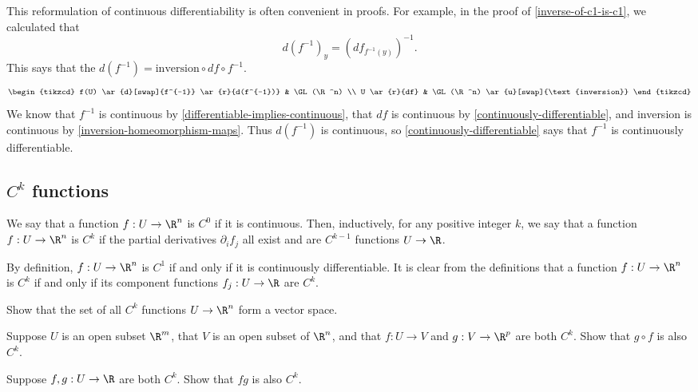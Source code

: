 \begin{remark}
	This reformulation of continuous differentiability is often convenient in proofs. For example, in the proof of \cref{inverse-of-c1-is-c1}, we calculated that
	\[ d(f^{-1})_y = (df_{f^{-1}(y)})^{-1}. \]
	This says that the $d(f^{-1}) = \text{inversion} \circ df \circ f^{-1}$. 
	\[ \begin{tikzcd} f(U) \ar{d}[swap]{f^{-1}} \ar{r}{d(f^{-1})} & \GL(\R^n) \\ U \ar{r}{df} & \GL(\R^n) \ar{u}[swap]{\text{inversion}}  \end{tikzcd} \]
	We know that $f^{-1}$ is continuous by \cref{differentiable-implies-continuous}, that $df$ is continuous by \cref{continuously-differentiable}, and inversion is continuous by \cref{inversion-homeomorphism-maps}. Thus $d(f^{-1})$ is continuous, so \cref{continuously-differentiable} says that $f^{-1}$ is continuously differentiable. 
\end{remark}

\subsection{\texorpdfstring{$C^k$}{Ck} functions}

\begin{definition}[$C^k$ functions] \label{cn-multivar}
	We say that a function $f : U \to \R^n$ is $C^0$ if it is continuous. Then, inductively, for any positive integer $k$, we say that a function $f : U \to \R^n$ is $C^k$ if the partial derivatives $\partial_i f_j$ all exist and are $C^{k-1}$ functions $U \to \R$. 
\end{definition}

By definition, $f : U \to \R^n$ is $C^1$ if and only if it is continuously differentiable. It is clear from the definitions that a function $f : U \to \R^n$ is $C^k$ if and only if its component functions $f_j : U \to \R$ are $C^k$. 

\begin{exercise}
	Show that the set of all $C^k$ functions $U \to \R^n$ form a vector space. 
\end{exercise}

\begin{exercise}
	Suppose $U$ is an open subset $\R^m$, that $V$ is an open subset of $\R^n$, and that $f : U \to V$ and $g : V \to \R^p$ are both $C^k$. Show that $g \circ f$ is also $C^k$. 
\end{exercise}

\begin{exercise}
	Suppose $f, g : U \to \R$ are both $C^k$. Show that $fg$ is also $C^k$. 
\end{exercise}

